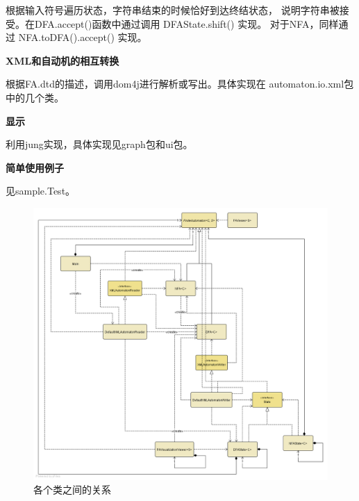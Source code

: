 \documentclass[12pt,a4paper]{article}
\begin{document}
\begin{CJK}{UTF8}{song}
    根据输入符号遍历状态，字符串结束的时候恰好到达终结状态，
        说明字符串被接受。在DFA.accept()函数中通过调用 DFAState.shift() 实现。
        对于NFA，同样通过 NFA.toDFA().accept() 实现。

    \textbf{XML和自动机的相互转换}

    根据FA.dtd的描述，调用dom4j进行解析或写出。具体实现在
        automaton.io.xml包中的几个类。

    \textbf{显示}

    利用jung实现，具体实现见graph包和ui包。

    \textbf{简单使用例子}

    见sample.Test。

    \begin{figure}
    \centering
    \includegraphics[scale=.3]{UML}
    \caption{各个类之间的关系}
    \label{fig:uml}
    \end{figure}

\newpage
\end{CJK}
\end{document}
